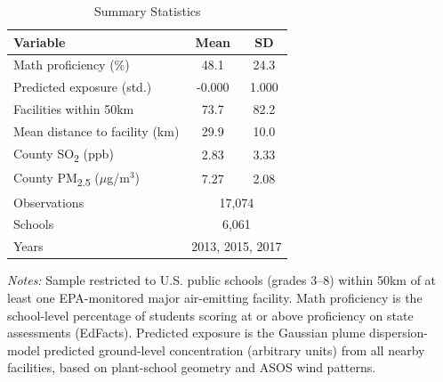 \begin{table}[htbp]
\centering
\caption{Summary Statistics}
\label{tab:summary}
\begin{tabular}{lcc}
\hline\hline
Variable & Mean & SD \\
\hline
Math proficiency (\%) & 48.1 & 24.3 \\
Predicted exposure (std.) & -0.000 & 1.000 \\
Facilities within 50km & 73.7 & 82.2 \\
Mean distance to facility (km) & 29.9 & 10.0 \\
County SO\textsubscript{2} (ppb) & 2.83 & 3.33 \\
County PM\textsubscript{2.5} ($\mu$g/m$^3$) & 7.27 & 2.08 \\
\hline
Observations & \multicolumn{2}{c}{17,074} \\
Schools & \multicolumn{2}{c}{6,061} \\
Years & \multicolumn{2}{c}{2013, 2015, 2017} \\
\hline\hline
\end{tabular}
\begin{tablenotes}
\small
\item \textit{Notes:} Sample restricted to U.S. public schools (grades 3--8) within 50km of at least one EPA-monitored major air-emitting facility. Math proficiency is the school-level percentage of students scoring at or above proficiency on state assessments (EdFacts). Predicted exposure is the Gaussian plume dispersion-model predicted ground-level concentration (arbitrary units) from all nearby facilities, based on plant-school geometry and ASOS wind patterns.
\end{tablenotes}
\end{table}
